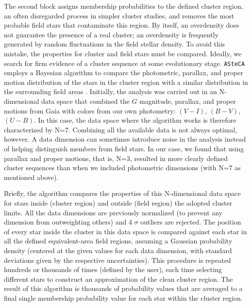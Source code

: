 \documentclass[draft]{aa}
\begin{document}
The second block assigns membership probabilities to the defined
cluster region, an often disregarded process in simpler cluster studies, 
and removes the most probable field stars that contaminate this region.
By itself, an overdensity does not guarantee the presence of a real cluster;
 an overdensity is frequently generated by random fluctuations in the field stellar
density. To avoid this mistake, the properties for cluster and
field stars must be compared. Ideally, we search for firm evidence of
a cluster sequence at some evolutionary stage. \texttt{ASteCA} employs a
Bayesian algorithm to compare the photometric, parallax, and proper motion
distribution of the stars in the cluster region with a similar distribution in
the surrounding field areas \citep{Perren_2015}. Initially, the analysis
was carried out in an N-dimensional data space that combined the
$G$ magnitude, parallax, and proper motions from Gaia with colors from our own
photometry: $(V-I)$, $(B-V)$, $(U-B)$. In this case, the data space where
the algorithm works is therefore characterized by N=7.
Combining all the available data is not always optimal, however. A
data dimension can sometimes introduce noise in the analysis instead of helping
distinguish members from field stars. In our case, we found that using
parallax and proper motions, that is, N=3, resulted in more clearly defined
cluster sequences than when we included photometric dimensions (with N=7 as
mentioned above).

%
Briefly, the algorithm compares the properties of this N-dimensional data space
for stars inside (cluster region) and outside (field region)
the adopted cluster limits. All the data dimensions are previously normalized 
(to prevent any dimension from outweighting others) and 4 $\sigma$ outliers are
rejected.
The position of every star inside the cluster in this data space is compared
against each star in all the defined equivalent-area field regions,
assuming a Gaussian probability density (centered at the given values for each
data dimension, with standard deviations given by the respective
uncertainties). This procedure is repeated hundreds or thousands of times 
(defined by the user), each time selecting different stars to construct an
approximation of the clean cluster region. The result of this
algorithm is thousands of probability values that are averaged to a final
single membership probability value for each star within the cluster region.
\end{document}
